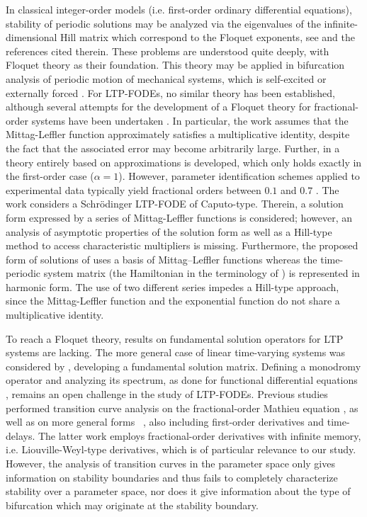 \documentclass{svproc}
\begin{document}
{		In classical integer-order models (i.e. first-order ordinary differential equations), stability of periodic solutions may be analyzed via the eigenvalues of the infinite-dimensional Hill matrix which correspond to the Floquet exponents, see \cite{Bayer2023a} and the references cited therein. These problems are understood quite deeply, with Floquet theory as their foundation. This theory may be applied in bifurcation analysis of periodic motion of mechanical systems, which is self-excited \cite{Horvath2022} or externally forced \cite{Youssef2025}. { For LTP-FODEs, no similar theory has been established, although several attempts for the development of a Floquet theory for fractional-order systems have been undertaken \cite{Rezazadeh2016,Iomin2023}.  In particular, the work \cite{Rezazadeh2016} assumes that the Mittag-Leffler function approximately satisfies a multiplicative identity, despite the fact that the associated error may become arbitrarily large. Further, in \cite{Rezazadeh2016} a theory entirely based on approximations is developed, which only holds exactly in the first-order case ($\alpha =1 $). However, parameter identification schemes applied to experimental data typically yield fractional orders between $0.1$ and $0.7$ \cite{Pawlak2021,HinzeExperiment,Kim2009,Stark2021}.} {The work \cite{Iomin2023} considers a Schrödinger LTP-FODE of Caputo-type. Therein, a solution form expressed by a series of Mittag-Leffler functions is considered; however, an analysis of asymptotic properties of the solution form as well as a Hill-type method to access characteristic multipliers is missing. Furthermore, the proposed form of solutions of \cite{Iomin2023} uses a basis of Mittag–Leffler functions whereas the time-periodic system matrix (the Hamiltonian in the terminology of \cite{Iomin2023}) is represented in harmonic form. The use of two different series impedes a Hill-type approach, since the Mittag-Leffler function and the exponential function do not share a multiplicative identity.}
        
        To reach a Floquet theory, results on fundamental solution operators for LTP systems are lacking. The more general case of linear time-varying systems was considered by \cite{Gomoyunov2020}, developing a fundamental solution matrix. Defining a monodromy operator and analyzing its spectrum, as done for functional differential equations \cite{Hale1977}, remains an open challenge in the study of LTP-FODEs. Previous studies performed transition curve analysis on the fractional-order Mathieu equation \cite{Rand2010,Shahroudi2024}, as well as on more general forms ~\cite{Daibiri2015}, also including first-order derivatives and time-delays. The latter work employs fractional-order derivatives with infinite memory, i.e. Liouville-Weyl-type derivatives, which is of particular relevance to our study.  However, the analysis of transition curves in the parameter space only gives information on stability boundaries and thus fails to completely characterize stability over a parameter space, nor does it give information about the type of bifurcation which may originate at the stability boundary. 

}
\end{document}
